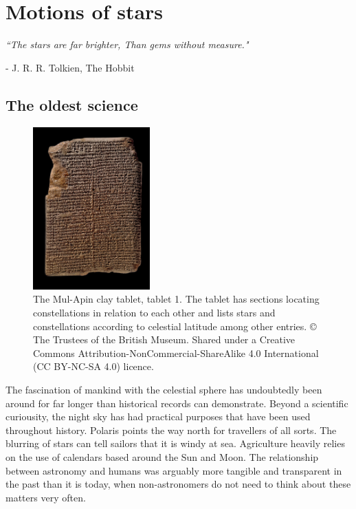 \chapter{Motions of stars}\label{chap:motions}
\begin{flushright}
\textit{``The stars are far brighter, Than gems without measure."}

- J. R. R. Tolkien, The Hobbit
\end{flushright}
\section{The oldest science}\label{sec:oldest}
\begin{figure}[t]
    \centering
    \includegraphics[width=0.4\textwidth]{images/tablet.jpeg}
    \caption{The Mul-Apin clay tablet, tablet 1. The tablet has sections locating constellations in relation to each other and lists stars and constellations according to celestial latitude among other entries. © The Trustees of the British Museum. Shared under a Creative Commons Attribution-NonCommercial-ShareAlike 4.0 International (CC BY-NC-SA 4.0) licence.} %
    \label{fig:tablet}
\end{figure}
The fascination of mankind with the celestial sphere has undoubtedly been around for far longer than historical records can demonstrate. Beyond a scientific curiousity, the night sky has had practical purposes that have been used throughout history. Polaris points the way north for travellers of all sorts. The blurring of stars can tell sailors that it is windy at sea. Agriculture heavily relies on the use of calendars based around the Sun and Moon. The relationship between astronomy and humans was arguably more tangible and transparent in the past than it is today, when non-astronomers do not need to think about these matters very often. 

